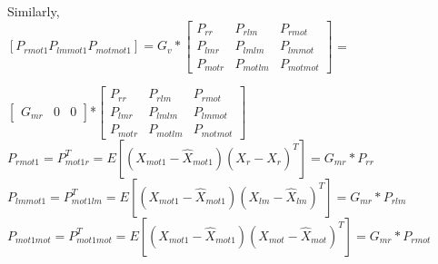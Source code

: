 \documentclass[11pt,a4paper]{article}
\begin{document}
\noindent Similarly,\\
\noindent $[P_{rmot1}  P_{lmmot1}  P_{motmot1}] = G_{v}*\begin{bmatrix} P_{rr} & P_{rlm} & P_{rmot}\\
										   P_{lmr}& P_{lmlm}  & P_{lmmot}\\
										   P_{motr}& P_{motlm}  & P_{motmot}\end{bmatrix}$ =
										   
										    $  \begin{bmatrix} G_{mr} & 0 & 0 \end{bmatrix}$*$\begin{bmatrix} P_{rr} & P_{rlm} & P_{rmot}\\
										   P_{lmr}& P_{lmlm}  & P_{lmmot}\\
										   P_{motr}& P_{motlm}  & P_{motmot}\end{bmatrix}$\\										   
$P_{rmot1} = P_{mot1r}^{T} = E[(X_{mot1}- \hat{X}_{mot1})(X_{r}- \hat{X}_{r})^{T}] = G_{mr}*P_{rr} $  \\
$P_{lmmot1} = P_{mot1lm}^{T} = E[(X_{mot1}- \hat{X}_{mot1})(X_{lm}- \hat{X}_{lm})^{T}] = G_{mr}*P_{rlm} $  \\
$P_{mot1mot} = P_{mot1mot}^{T} = E[(X_{mot1}- \hat{X}_{mot1})(X_{mot}- \hat{X}_{mot})^{T}] = G_{mr}*P_{rmot} $  \\ 
\end{document}
